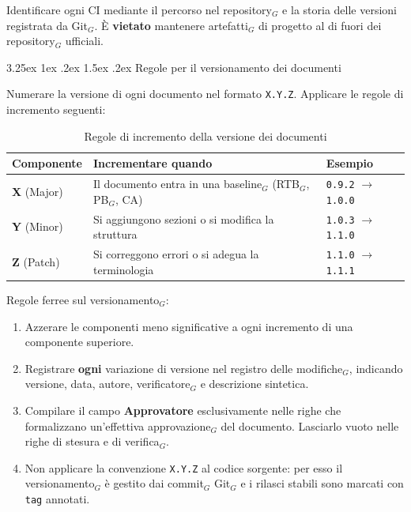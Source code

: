 \documentclass[a4paper, 10pt]{article}
\makeatletter
\renewcommand{\arraystretch}{1.2}
\renewcommand\paragraph{\@startsection{paragraph}{4}{\z@}%
  {3.25ex \@plus1ex \@minus .2ex}%
  {1.5ex \@plus .2ex}%
  {\normalfont\normalsize\bfseries}}
\makeatother
\begin{document}
\noindent Identificare ogni CI mediante il percorso nel repository$_G$ e la storia delle versioni registrata da Git$_G$. È \textbf{vietato} mantenere artefatti$_G$ di progetto al di fuori dei repository$_G$ ufficiali.

\paragraph{Regole per il versionamento dei documenti}

Numerare la versione di ogni documento nel formato \texttt{X.Y.Z}. Applicare le regole di incremento seguenti:

\begin{table}[H]
    \centering
    \renewcommand{\arraystretch}{1.3}
    \begin{tabularx}{\textwidth}{|l|L|L|}
        \hline
        \textbf{Componente} & \textbf{Incrementare quando} & \textbf{Esempio} \\
        \hline
        \textbf{X} (Major) & Il documento entra in una baseline$_G$ (RTB$_G$, PB$_G$, CA) & \texttt{0.9.2} $\rightarrow$ \texttt{1.0.0} \\ \hline
        \textbf{Y} (Minor) & Si aggiungono sezioni o si modifica la struttura & \texttt{1.0.3} $\rightarrow$ \texttt{1.1.0} \\ \hline
        \textbf{Z} (Patch) & Si correggono errori o si adegua la terminologia & \texttt{1.1.0} $\rightarrow$ \texttt{1.1.1} \\ \hline
    \end{tabularx}
    \caption{Regole di incremento della versione dei documenti}
\end{table}

\noindent Regole ferree sul versionamento$_G$:
\begin{enumerate}
    \item Azzerare le componenti meno significative a ogni incremento di una componente superiore.
    \item Registrare \textbf{ogni} variazione di versione nel registro delle modifiche$_G$, indicando versione, data, autore, verificatore$_G$ e descrizione sintetica.
    \item Compilare il campo \textbf{Approvatore} esclusivamente nelle righe che formalizzano un'effettiva approvazione$_G$ del documento. Lasciarlo vuoto nelle righe di stesura e di verifica$_G$.
    \item Non applicare la convenzione \texttt{X.Y.Z} al codice sorgente: per esso il versionamento$_G$ è gestito dai commit$_G$ Git$_G$ e i rilasci stabili sono marcati con \texttt{tag} annotati.
\end{enumerate}
\end{document}
